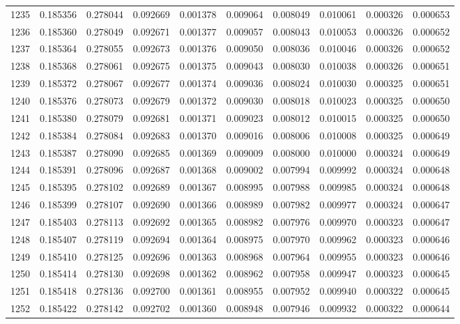 \begin{tabular}{lrrrrrrrrr}
1235 & 0.185356 & 0.278044 & 0.092669 & 0.001378 & 0.009064 & 0.008049 & 0.010061 & 0.000326 & 0.000653 \\
1236 & 0.185360 & 0.278049 & 0.092671 & 0.001377 & 0.009057 & 0.008043 & 0.010053 & 0.000326 & 0.000652 \\
1237 & 0.185364 & 0.278055 & 0.092673 & 0.001376 & 0.009050 & 0.008036 & 0.010046 & 0.000326 & 0.000652 \\
1238 & 0.185368 & 0.278061 & 0.092675 & 0.001375 & 0.009043 & 0.008030 & 0.010038 & 0.000326 & 0.000651 \\
1239 & 0.185372 & 0.278067 & 0.092677 & 0.001374 & 0.009036 & 0.008024 & 0.010030 & 0.000325 & 0.000651 \\
1240 & 0.185376 & 0.278073 & 0.092679 & 0.001372 & 0.009030 & 0.008018 & 0.010023 & 0.000325 & 0.000650 \\
1241 & 0.185380 & 0.278079 & 0.092681 & 0.001371 & 0.009023 & 0.008012 & 0.010015 & 0.000325 & 0.000650 \\
1242 & 0.185384 & 0.278084 & 0.092683 & 0.001370 & 0.009016 & 0.008006 & 0.010008 & 0.000325 & 0.000649 \\
1243 & 0.185387 & 0.278090 & 0.092685 & 0.001369 & 0.009009 & 0.008000 & 0.010000 & 0.000324 & 0.000649 \\
1244 & 0.185391 & 0.278096 & 0.092687 & 0.001368 & 0.009002 & 0.007994 & 0.009992 & 0.000324 & 0.000648 \\
1245 & 0.185395 & 0.278102 & 0.092689 & 0.001367 & 0.008995 & 0.007988 & 0.009985 & 0.000324 & 0.000648 \\
1246 & 0.185399 & 0.278107 & 0.092690 & 0.001366 & 0.008989 & 0.007982 & 0.009977 & 0.000324 & 0.000647 \\
1247 & 0.185403 & 0.278113 & 0.092692 & 0.001365 & 0.008982 & 0.007976 & 0.009970 & 0.000323 & 0.000647 \\
1248 & 0.185407 & 0.278119 & 0.092694 & 0.001364 & 0.008975 & 0.007970 & 0.009962 & 0.000323 & 0.000646 \\
1249 & 0.185410 & 0.278125 & 0.092696 & 0.001363 & 0.008968 & 0.007964 & 0.009955 & 0.000323 & 0.000646 \\
1250 & 0.185414 & 0.278130 & 0.092698 & 0.001362 & 0.008962 & 0.007958 & 0.009947 & 0.000323 & 0.000645 \\
1251 & 0.185418 & 0.278136 & 0.092700 & 0.001361 & 0.008955 & 0.007952 & 0.009940 & 0.000322 & 0.000645 \\
1252 & 0.185422 & 0.278142 & 0.092702 & 0.001360 & 0.008948 & 0.007946 & 0.009932 & 0.000322 & 0.000644 \\

\end{tabular}
